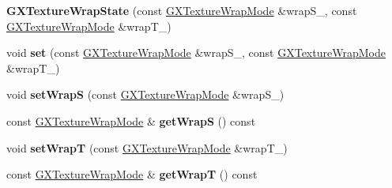 \begin{DoxyCompactItemize}
\item 
{\bfseries G\+X\+Texture\+Wrap\+State} (const \hyperlink{class_i_dream_sky_1_1_g_x_texture_wrap_mode}{G\+X\+Texture\+Wrap\+Mode} \&wrap\+S\+\_\+, const \hyperlink{class_i_dream_sky_1_1_g_x_texture_wrap_mode}{G\+X\+Texture\+Wrap\+Mode} \&wrap\+T\+\_\+)\hypertarget{class_i_dream_sky_1_1_g_x_texture_wrap_state_abb0ed786f18bca0a1cb0cbd374fc47d3}{}\label{class_i_dream_sky_1_1_g_x_texture_wrap_state_abb0ed786f18bca0a1cb0cbd374fc47d3}

\item 
void {\bfseries set} (const \hyperlink{class_i_dream_sky_1_1_g_x_texture_wrap_mode}{G\+X\+Texture\+Wrap\+Mode} \&wrap\+S\+\_\+, const \hyperlink{class_i_dream_sky_1_1_g_x_texture_wrap_mode}{G\+X\+Texture\+Wrap\+Mode} \&wrap\+T\+\_\+)\hypertarget{class_i_dream_sky_1_1_g_x_texture_wrap_state_a213834d719d752d77557f45612076219}{}\label{class_i_dream_sky_1_1_g_x_texture_wrap_state_a213834d719d752d77557f45612076219}

\item 
void {\bfseries set\+WrapS} (const \hyperlink{class_i_dream_sky_1_1_g_x_texture_wrap_mode}{G\+X\+Texture\+Wrap\+Mode} \&wrap\+S\+\_\+)\hypertarget{class_i_dream_sky_1_1_g_x_texture_wrap_state_a9abd7cd00ddffbab0c5f3ad67062a862}{}\label{class_i_dream_sky_1_1_g_x_texture_wrap_state_a9abd7cd00ddffbab0c5f3ad67062a862}

\item 
const \hyperlink{class_i_dream_sky_1_1_g_x_texture_wrap_mode}{G\+X\+Texture\+Wrap\+Mode} \& {\bfseries get\+WrapS} () const \hypertarget{class_i_dream_sky_1_1_g_x_texture_wrap_state_a103da16fecd3860c45c3f608c41b0d54}{}\label{class_i_dream_sky_1_1_g_x_texture_wrap_state_a103da16fecd3860c45c3f608c41b0d54}

\item 
void {\bfseries set\+WrapT} (const \hyperlink{class_i_dream_sky_1_1_g_x_texture_wrap_mode}{G\+X\+Texture\+Wrap\+Mode} \&wrap\+T\+\_\+)\hypertarget{class_i_dream_sky_1_1_g_x_texture_wrap_state_a7ef09d1c2bb7240ac178337a0e2144f8}{}\label{class_i_dream_sky_1_1_g_x_texture_wrap_state_a7ef09d1c2bb7240ac178337a0e2144f8}

\item 
const \hyperlink{class_i_dream_sky_1_1_g_x_texture_wrap_mode}{G\+X\+Texture\+Wrap\+Mode} \& {\bfseries get\+WrapT} () const \hypertarget{class_i_dream_sky_1_1_g_x_texture_wrap_state_a8b75506cb8a1358a09a1f5c7a8b81691}{}\label{class_i_dream_sky_1_1_g_x_texture_wrap_state_a8b75506cb8a1358a09a1f5c7a8b81691}

\end{DoxyCompactItemize}


